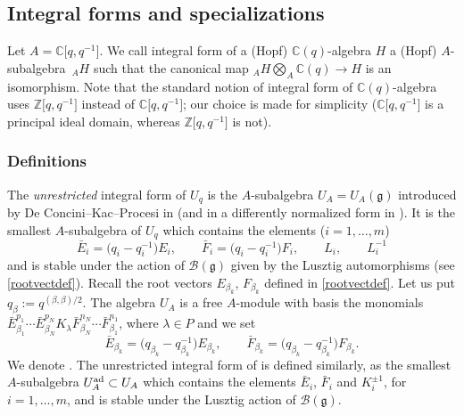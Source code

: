 \documentclass[pdftex]{sigma}
\numberwithin{equation}{section}
\theoremstyle{definition}
\newcommand{\mc}{\mathbb{C}}
\newcommand{\mz}{\mathbb{Z}}
\newcommand{\ra}{\rightarrow}
\begin{document}
\subsection{Integral forms and specializations}\label{INTEG} Let $A=\mc\big[q,q^{-1}\big]$. We call integral form of a (Hopf) $\mc(q)$-algebra $H$ a (Hopf) $A$-subalgebra~${}_AH$ such that the canonical map ${}_AH\bigotimes_A \mc(q) \ra H$ is an isomorphism. Note that the standard notion of integral form of $\mc(q)$-algebra uses $\mz\big[q,q^{-1}\big]$ instead of $\mc\big[q,q^{-1}\big]$; our choice is made for simplicity ($\mc\big[q,q^{-1}\big]$ is a principal ideal domain, whereas $\mz\big[q,q^{-1}\big]$ is not).

\subsubsection{Definitions}\label{defintform} The {\it unrestricted} integral form of $U_q$ is the $A$-subalgebra $U_A = U_A(\mathfrak{g})$ introduced by De Concini--Kac--Procesi in \cite[Section 12]{DC-K-P2} (and in a differently normalized form in \cite{DC-K,DC-K-P1}). It is the smallest $A$-subalgebra of $U_q$ which contains the elements ($i=1,\dots,m$)
\begin{equation}\label{normgen0}
\bar{E}_i = \big(q_i-q_i^{-1}\big)E_i,\qquad \bar{F}_i = \big(q_i-q_i^{-1}\big)F_i,\qquad L_i,\qquad L_i^{-1}
\end{equation}
and is stable under the action of $\mathcal{B}(\mathfrak{g})$ given by the Lusztig automorphisms (see \eqref{rootvectdef}). Recall the root vectors $E_{\beta_k}$, $F_{\beta_k}$ defined in \eqref{rootvectdef}. Let us put $q_\beta := q^{(\beta,\beta)/2}$. The algebra $U_A$ is a free $A$-module with basis the monomials $\bar{E}_{\beta_1}^{p_1}\cdots \bar{E}_{\beta_N}^{p_N}K_\lambda \bar{F}_{\beta_N}^{n_N}\cdots \bar{F}_{\beta_1}^{n_1}$, where $\lambda \in P$ and we set
\[\bar{E}_{\beta_k}= \big(q_{\beta_k}-q_{\beta_k}^{-1}\big)E_{\beta_k},\qquad \bar{F}_{\beta_k}= \big(q_{\beta_k}-q_{\beta_k}^{-1}\big)F_{\beta_k}.\]
We denote .
The unrestricted integral form of  is defined similarly, as the smallest $A$-subalgebra $U_A^{\rm ad} \subset U_A$ which contains the elements $\bar{E}_i$, $\bar{F}_i$ and $K_i^{\pm 1}$, for $i=1,\dots,m$, and is stable under the Lusztig action of $\mathcal{B}(\mathfrak{g})$.
\end{document}
